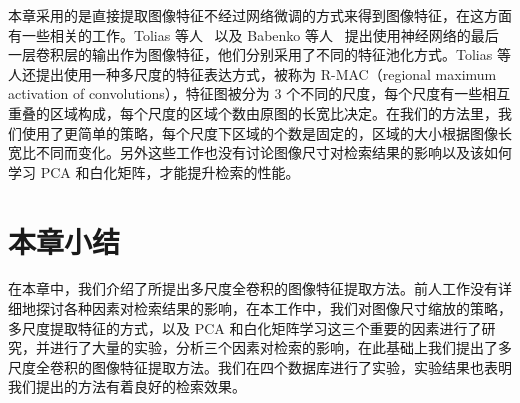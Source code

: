 本章采用的是直接提取图像特征不经过网络微调的方式来得到图像特征，在这方面有一些相关的工作。Tolias 等人~\cite{Tolias2015ParticularOR} 以及 Babenko 等人~\cite{Babenko2015AggregatingLD} 提出使用神经网络的最后一层卷积层的输出作为图像特征，他们分别采用了不同的特征池化方式。Tolias 等人还提出使用一种多尺度的特征表达方式，被称为 R-MAC（regional maximum activation of convolutions），特征图被分为 3 个不同的尺度，每个尺度有一些相互重叠的区域构成，每个尺度的区域个数由原图的长宽比决定。在我们的方法里，我们使用了更简单的策略，每个尺度下区域的个数是固定的，区域的大小根据图像长宽比不同而变化。另外这些工作也没有讨论图像尺寸对检索结果的影响以及该如何学习 PCA 和白化矩阵，才能提升检索的性能。

\section{本章小结}\label{sec:mfc_conclusion}
在本章中，我们介绍了所提出多尺度全卷积的图像特征提取方法。前人工作没有详细地探讨各种因素对检索结果的影响，在本工作中，我们对图像尺寸缩放的策略，多尺度提取特征的方式，以及 PCA 和白化矩阵学习这三个重要的因素进行了研究，并进行了大量的实验，分析三个因素对检索的影响，在此基础上我们提出了多尺度全卷积的图像特征提取方法。我们在四个数据库进行了实验，实验结果也表明我们提出的方法有着良好的检索效果。
